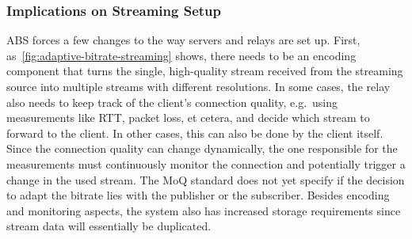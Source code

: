 \subsubsection{Implications on Streaming Setup}
ABS forces a few changes to the way servers and relays are set up.
First, as~\autoref{fig:adaptive-bitrate-streaming} shows, there needs to 
be an encoding component that turns the single, high-quality stream  
received from the streaming source into multiple streams with different resolutions.
In some cases, the relay also needs to keep track of the client's connection quality, e.g.~using 
measurements like RTT, packet loss, et cetera, and decide which stream to forward to the client.
In other cases, this can also be done by the client itself.
Since the connection quality can change dynamically, the one responsible for
the measurements must continuously monitor the connection and potentially trigger a change in 
the used stream.
The MoQ standard does not yet specify if the decision to adapt the bitrate lies with the
publisher or the subscriber.
Besides encoding and monitoring aspects, the system also has increased storage requirements
since stream data will essentially be duplicated.
